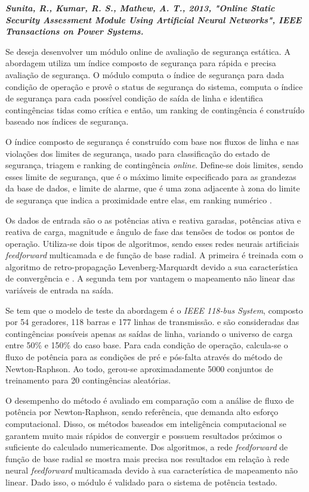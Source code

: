 \documentclass[12pt,oneside,a4paper,chapter=TITLE,section=TITLE,sumario=tradicional,english,brazil]{abntex2}
\begin{document}
\textbf{\textit{Sunita, R., Kumar, R. S., Mathew, A. T., 2013, "Online Static Security Assessment Module Using Artificial Neural Networks", IEEE Transactions on Power Systems.}}\par
	Se deseja desenvolver um módulo online de avaliação de segurança estática. A abordagem utiliza um índice composto de segurança para rápida e precisa avaliação de segurança. O módulo computa o índice de segurança para dada condição de operação e provê o status de segurança do sistema, computa o índice de segurança para cada possível condição de saída de linha e identifica contingências tidas como crítica e então, um ranking de contingência é construído baseado nos índices de segurança.\par 
	O índice composto de segurança é construído com base nos fluxos de linha e nas violações dos limites de segurança, usado para classificação do estado de segurança, triagem e ranking de contingência \textit{online}. Define-se dois limites, sendo esses limite de segurança, que é o máximo limite especificado para as grandezas da base de dados, e limite de alarme, que é uma zona adjacente à zona do limite de segurança que indica a proximidade entre elas, em ranking numérico \cite{sunitha2011}.\par
	Os dados de entrada são o as potências ativa e reativa garadas, potências ativa e reativa de carga, magnitude e ângulo de fase das tensões de todos os pontos de operação. Utiliza-se dois tipos de algoritmos, sendo esses redes neurais artificiais \textit{feedforward} multicamada e de função de base radial. A primeira é treinada com o algoritmo de retro-propagação Levenberg-Marquardt devido a sua característica de convergência e \cite{sidhu2000}. A segunda tem por vantagem o mapeamento não linear das variáveis de entrada na saída.\par 
	Se tem que o modelo de teste da abordagem é o \textit{IEEE 118-bus System}, composto por 54 geradores, 118 barras e 177 linhas de transmissão. e são consideradas das contingências possíveis apenas as saídas de linha, variando o universo de carga entre 50\% e 150\% do caso base. Para cada condição de operação, calcula-se o fluxo de potência para as condições de pré e pós-falta através do método de Newton-Raphson. Ao todo, gerou-se aproximadamente 5000 conjuntos de treinamento para 20 contingências aleatórias.\par 
	O desempenho do método é avaliado em comparação com a análise de fluxo de potência por Newton-Raphson, sendo referência, que demanda alto esforço computacional. Disso, os métodos baseados em inteligência computacional se garantem muito mais rápidos de convergir e possuem resultados próximos o suficiente do calculado numericamente. Dos algoritmos, a rede \textit{feedforward} de função de base radial se mostra mais precisa nos resultados em relação à rede neural \textit{feedforward} multicamada devido à sua característica de mapeamento não linear. Dado isso, o módulo é validado para o sistema de potência testado.\par 
\end{document}
